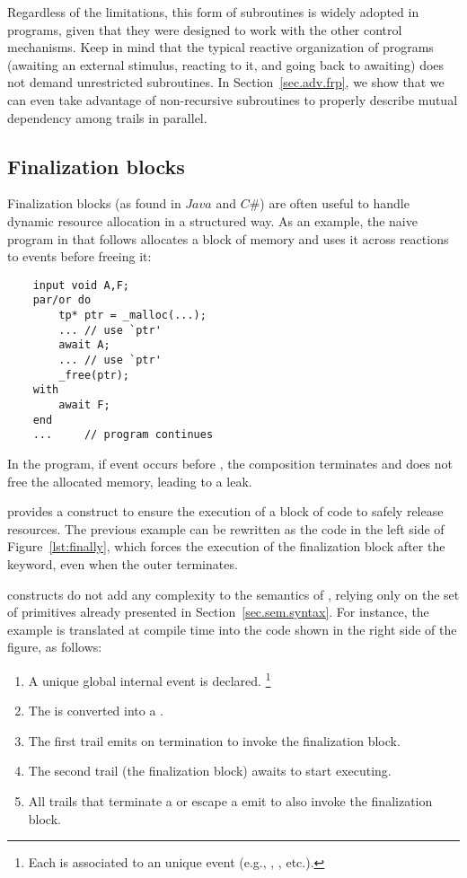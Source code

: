Regardless of the limitations, this form of subroutines is widely adopted in 
\CEU programs, given that they were designed to work with the other control 
mechanisms.
Keep in mind that the typical reactive organization of programs (awaiting an 
external stimulus, reacting to it, and going back to awaiting) does not demand 
unrestricted subroutines.
In Section~\ref{sec.adv.frp}, we show that we can even take advantage of 
non-recursive subroutines to properly describe mutual dependency among trails 
in parallel.

\subsection{Finalization blocks}
\label{sec.adv.fin}

Finalization blocks (as found in $Java$ and $C\#$) are often useful to handle 
dynamic resource allocation in a structured way.
As an example, the naive program in \CEU that follows allocates a block of 
memory and uses it across reactions to events before freeing it:

{\small
\begin{verbatim}
    input void A,F;
    par/or do
        tp* ptr = _malloc(...);
        ... // use `ptr'
        await A;
        ... // use `ptr'
        _free(ptr);
    with
        await F;
    end
    ...     // program continues
\end{verbatim}
}

In the program, if event  occurs before , the  
composition terminates and does not free the allocated memory, leading to a 
leak.

\CEU provides a \DOFIN construct to ensure the execution of a block of code to 
safely release resources.
The previous example can be rewritten as the code in the left side of
Figure~\ref{lst:finally}, which forces the execution of the finalization block 
after the \FIN keyword, even when the outer  terminates.

\DOFIN constructs do not add any complexity to the semantics of \CEU, relying 
only on the set of primitives already presented in 
Section~\ref{sec.sem.syntax}.
For instance, the example is translated at compile time into the code shown in 
the right side of the figure, as follows:

\begin{enumerate}
\item A unique global internal event  is declared.%
\footnote{Each \DOFIN is associated to an unique event (e.g.,  , 
, etc.).}
\item The \DOFIN is converted into a .
\item The first  trail emits  on termination to invoke 
the finalization block.
\item The second  trail (the finalization block) awaits 
 to start executing.
\item All trails that terminate a  or escape a  emit 
 to also invoke the finalization block.
\end{enumerate}

